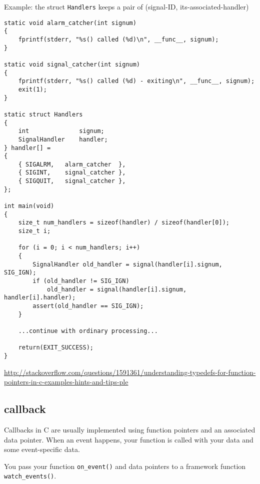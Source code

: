 Example: the struct \verb!Handlers! keeps a pair of (signal-ID,
its-associated-handler)
\begin{lstlisting}
static void alarm_catcher(int signum)
{
    fprintf(stderr, "%s() called (%d)\n", __func__, signum);
}

static void signal_catcher(int signum)
{
    fprintf(stderr, "%s() called (%d) - exiting\n", __func__, signum);
    exit(1);
}

static struct Handlers
{
    int              signum;
    SignalHandler    handler;
} handler[] =
{
    { SIGALRM,   alarm_catcher  },
    { SIGINT,    signal_catcher },
    { SIGQUIT,   signal_catcher },
};

int main(void)
{
    size_t num_handlers = sizeof(handler) / sizeof(handler[0]);
    size_t i;

    for (i = 0; i < num_handlers; i++)
    {
        SignalHandler old_handler = signal(handler[i].signum, SIG_IGN);
        if (old_handler != SIG_IGN)
            old_handler = signal(handler[i].signum, handler[i].handler);
        assert(old_handler == SIG_IGN);
    }

    ...continue with ordinary processing...

    return(EXIT_SUCCESS);
}
\end{lstlisting}

\url{http://stackoverflow.com/questions/1591361/understanding-typedefs-for-function-pointers-in-c-examples-hints-and-tips-ple}


\subsection{callback}
\label{sec:callback}

Callbacks in C are usually implemented using function pointers and an associated
data pointer. When an event happens, your function is called with your data and some
event-specific data.

You pass your function \verb!on_event()! and data pointers to a framework
function \verb!watch_events()!.

